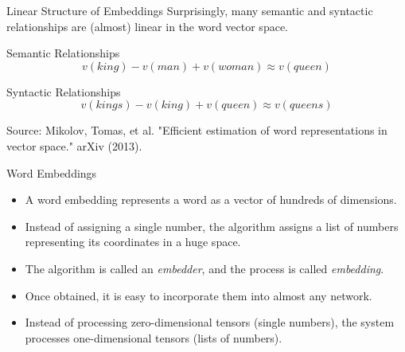 \documentclass[aspectratio=169]{beamer}
\begin{document}
\begin{frame}{Linear Structure of Embeddings}
	Surprisingly, many semantic and syntactic relationships are (almost) linear in the word vector space.
	
	\begin{block}{Semantic Relationships}
		$$v(king) - v(man) + v(woman) \approx v(queen)$$
		\tiny
	\end{block}
	
	\begin{block}{Syntactic Relationships}
		$$v(kings) - v(king) + v(queen) \approx v(queens)$$
		\tiny
	\end{block}
	
	\vfill
	\tiny Source: Mikolov, Tomas, et al. "Efficient estimation of word representations in vector space." arXiv (2013).
\end{frame}

\begin{frame}{Word Embeddings}
	\begin{itemize}
		\item A word embedding represents a word as a vector of hundreds of dimensions.
		\item Instead of assigning a single number, the algorithm assigns a list of numbers representing its coordinates in a huge space.
		\item The algorithm is called an \textit{embedder}, and the process is called \textit{embedding}.
		\item Once obtained, it is easy to incorporate them into almost any network.
		\item Instead of processing zero-dimensional tensors (single numbers), the system processes one-dimensional tensors (lists of numbers).
	\end{itemize}
\end{frame}
\end{document}
